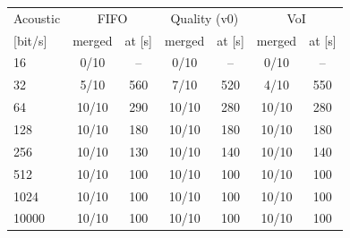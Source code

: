 \begin{tabular}{lcccccc}
\toprule
Acoustic & \multicolumn{2}{c}{FIFO} & \multicolumn{2}{c}{Quality (v0)} & \multicolumn{2}{c}{VoI} \\
{[bit/s]} & merged & at [s] & merged & at [s] & merged & at [s] \\
\midrule
16 & 0/10 & -- & 0/10 & -- & 0/10 & -- \\
32 & 5/10 & 560 & 7/10 & 520 & 4/10 & 550 \\
64 & 10/10 & 290 & 10/10 & 280 & 10/10 & 280 \\
128 & 10/10 & 180 & 10/10 & 180 & 10/10 & 180 \\
256 & 10/10 & 130 & 10/10 & 140 & 10/10 & 140 \\
512 & 10/10 & 100 & 10/10 & 100 & 10/10 & 100 \\
1024 & 10/10 & 100 & 10/10 & 100 & 10/10 & 100 \\
10000 & 10/10 & 100 & 10/10 & 100 & 10/10 & 100 \\
\bottomrule
\end{tabular}
